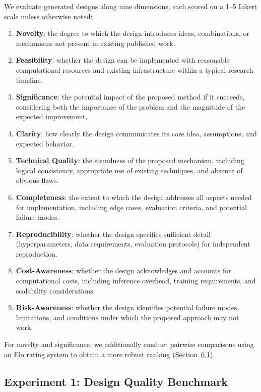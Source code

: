 We evaluate generated designs along nine dimensions, each scored on a 1--5 Likert scale unless otherwise noted:

\begin{enumerate}[leftmargin=2em]
    \item \textbf{Novelty}: the degree to which the design introduces ideas, combinations, or mechanisms not present in existing published work.
    \item \textbf{Feasibility}: whether the design can be implemented with reasonable computational resources and existing infrastructure within a typical research timeline.
    \item \textbf{Significance}: the potential impact of the proposed method if it succeeds, considering both the importance of the problem and the magnitude of the expected improvement.
    \item \textbf{Clarity}: how clearly the design communicates its core idea, assumptions, and expected behavior.
    \item \textbf{Technical Quality}: the soundness of the proposed mechanism, including logical consistency, appropriate use of existing techniques, and absence of obvious flaws.
    \item \textbf{Completeness}: the extent to which the design addresses all aspects needed for implementation, including edge cases, evaluation criteria, and potential failure modes.
    \item \textbf{Reproducibility}: whether the design specifies sufficient detail (hyperparameters, data requirements, evaluation protocols) for independent reproduction.
    \item \textbf{Cost-Awareness}: whether the design acknowledges and accounts for computational costs, including inference overhead, training requirements, and scalability considerations.
    \item \textbf{Risk-Awareness}: whether the design identifies potential failure modes, limitations, and conditions under which the proposed approach may not work.
\end{enumerate}

\noindent For novelty and significance, we additionally conduct pairwise comparisons using an Elo rating system \cite{elo1978rating} to obtain a more robust ranking (Section~\ref{subsec:design_quality}).


\subsection{Experiment 1: Design Quality Benchmark}
\label{subsec:design_quality}

